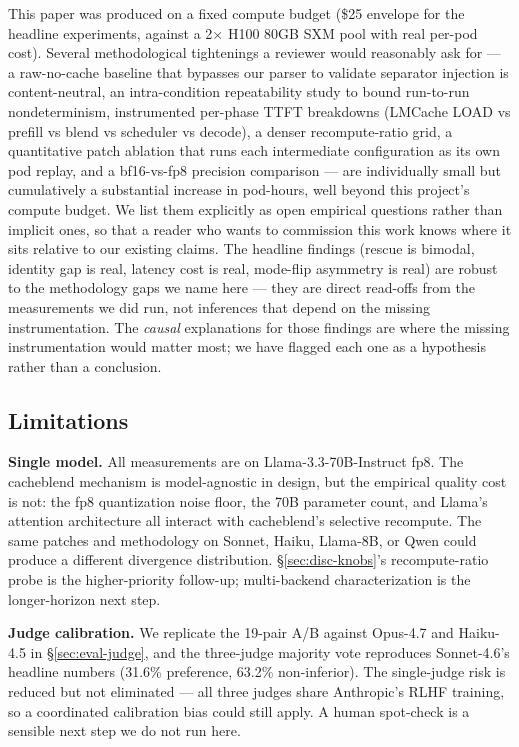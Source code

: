 This paper was produced on a fixed compute budget (\$25 envelope for
the headline experiments, against a 2$\times$ H100 80GB SXM pool with
real per-pod cost). Several methodological tightenings a reviewer
would reasonably ask for --- a raw-no-cache baseline that bypasses our
parser to validate separator injection is content-neutral, an
intra-condition repeatability study to bound run-to-run
nondeterminism, instrumented per-phase TTFT breakdowns (LMCache
LOAD vs prefill vs blend vs scheduler vs decode), a denser
recompute-ratio grid, a quantitative patch ablation that runs each
intermediate configuration as its own pod replay, and a bf16-vs-fp8
precision comparison --- are individually small but cumulatively a substantial increase in
pod-hours, well beyond this project's compute budget. We list them
explicitly as open empirical questions rather than implicit ones, so
that a reader who wants to commission this work knows where it sits
relative to our existing claims. The headline findings (rescue is
bimodal, identity gap is real, latency cost is real, mode-flip
asymmetry is real) are robust to the methodology gaps we name here ---
they are direct read-offs from the measurements we did run, not
inferences that depend on the missing instrumentation. The
\emph{causal} explanations for those findings are where the missing
instrumentation would matter most; we have flagged each one as a
hypothesis rather than a conclusion.

\subsection{Limitations}
\label{sec:disc-limits}

\textbf{Single model.} All measurements are on Llama-3.3-70B-Instruct
fp8. The cacheblend mechanism is model-agnostic in design, but the
empirical quality cost is not: the fp8 quantization noise floor, the
70B parameter count, and Llama's attention architecture all interact
with cacheblend's selective recompute. The same patches and methodology
on Sonnet, Haiku, Llama-8B, or Qwen could produce a different
divergence distribution. \S\ref{sec:disc-knobs}'s recompute-ratio probe
is the higher-priority follow-up; multi-backend characterization
is the longer-horizon next step.

\textbf{Judge calibration.} We replicate the 19-pair A/B against
Opus-4.7 and Haiku-4.5 in \S\ref{sec:eval-judge}, and the
three-judge majority vote reproduces Sonnet-4.6's headline numbers
(31.6\% preference, 63.2\% non-inferior). The single-judge risk is
reduced but not eliminated --- all three judges share Anthropic's
RLHF training, so a coordinated calibration bias could still apply.
A human spot-check is a sensible next step we do not run here.

